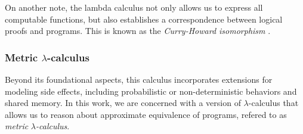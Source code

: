 On another note, the lambda calculus not only allows us to express all computable functions, but also establishes a correspondence between logical proofs and programs. This is known as the \emph{Curry-Howard isomorphism} \cite{girardProofsTypes1989}.




\subsubsection*{Metric $\lambda$-calculus}

Beyond its foundational aspects, this calculus incorporates extensions for modeling side effects, including probabilistic or non-deterministic behaviors and shared memory. In this work, we are concerned with a version of $\lambda$-calculus that allows us to reason about approximate equivalence of programs, refered to as \emph{metric }$\lambda$\emph{-calculus}.

\begin{comment}
Previous work~\cite{dahlqvist22,dahlqvist2023syntactic} introduced a quantalic generalisation of affine $\lambda$-calculus. In this note we start
investigating the incorportation of \emph{additive} structure to this body of
work. Specifically our focus is on the \emph{additive disjunction operator}
$\oplus$ which is typically interpreted via coproducts and gives rise to case
statements (\ie\ conditionals). Our motivation for it is highly practical: in
trying to reason quantitatively about higher-order programs we often fell short
when these involved conditionals. 
\end{comment}



